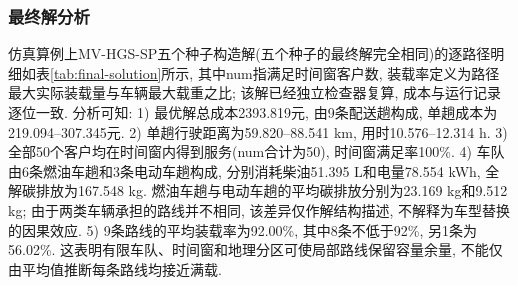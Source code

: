 \documentclass{setp-new}
\begin{document}
\subsubsection{最终解分析}

仿真算例上MV-HGS-SP五个种子构造解(五个种子的最终解完全相同)的逐路径明细如表\ref{tab:final-solution}所示,
其中num指满足时间窗客户数, 装载率定义为路径最大实际装载量与车辆最大载重之比;
该解已经独立检查器复算, 成本与运行记录逐位一致.
分析可知:
1) 最优解总成本2393.819元, 由9条配送趟构成, 单趟成本为219.094--307.345元.
2) 单趟行驶距离为59.820--88.541 km, 用时10.576--12.314 h.
3) 全部50个客户均在时间窗内得到服务(num合计为50), 时间窗满足率100\%.
4) 车队由6条燃油车趟和3条电动车趟构成, 分别消耗柴油51.395 L和电量78.554 kWh,
全解碳排放为167.548 kg. 燃油车趟与电动车趟的平均碳排放分别为23.169 kg和9.512 kg;
由于两类车辆承担的路线并不相同, 该差异仅作解结构描述, 不解释为车型替换的因果效应.
5) 9条路线的平均装载率为92.00\%, 其中8条不低于92\%, 另1条为56.02\%.
这表明有限车队、时间窗和地理分区可使局部路线保留容量余量, 不能仅由平均值推断每条路线均接近满载.
\end{document}
